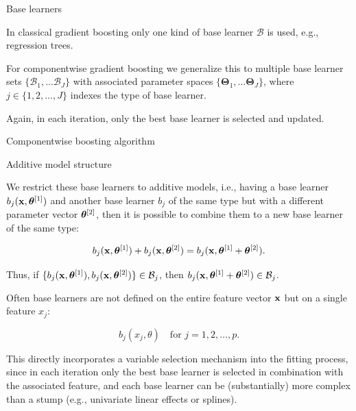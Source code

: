 
\begin{vbframe}{Base learners}

In classical gradient boosting only one kind of base learner $\mathcal{B}$ is used, e.g., 
regression trees.

\lz

For componentwise gradient boosting we generalize this to multiple base learner sets $\{ \mathcal{B}_1, ... \mathcal{B}_J \}$ with associated parameter spaces 
$\{ \bm{\Theta}_1, ... \bm{\Theta}_J \}$,
% 
 where $j \in \{ 1, 2, \dots, J \}$ indexes the type of base learner.
% 
\lz

Again, in each iteration, only the best base learner 
is selected and updated.

\end{vbframe}

\begin{vbframe}{Componentwise boosting algorithm}



\end{vbframe}
\begin{vbframe}{Additive model structure}
\begin{footnotesize}
We restrict these base learners to additive models, i.e., having a base learner $ b_j(\mathbf{x}, \bm{\theta}^{[1]})$ and another base learner $b_j$ of the same type but with a different parameter vector $\bm{\theta}^{[2]}$, then it is possible to combine them to a new base learner of the same type:

$$
 b_j(\mathbf{x}, \bm{\theta}^{[1]}) + b_j(\mathbf{x}, \bm{\theta}^{[2]}) = 
 b_j(\mathbf{x}, \bm{\theta}^{[1]} + \bm{\theta}^{[2]}).
$$
\vspace*{0.1cm}

Thus, if $\{ b_j(\mathbf{x}, \bm{\theta}^{[1]}), b_j(\mathbf{x}, \bm{\theta}^{[2]}) \} \in \mathcal{B}_j$, then $b_j(\mathbf{x}, \bm{\theta}^{[1]} + \bm{\theta}^{[2]}) \in \mathcal{B}_j$.
\lz

Often base learners are not defined on the entire feature vector $\mathbf{x}$ but on 
a single feature $x_j$:

$$
  b_j(x_j, \theta) \quad \text{for } j = 1, 2, \dots, p.
$$

This directly incorporates a variable selection mechanism into the fitting 
process, since in each iteration only the best base learner is selected in 
combination with the associated feature, and each base learner can be 
(substantially) more complex than a stump (e.g., univariate linear effects or 
splines).
\end{footnotesize}
\end{vbframe}



